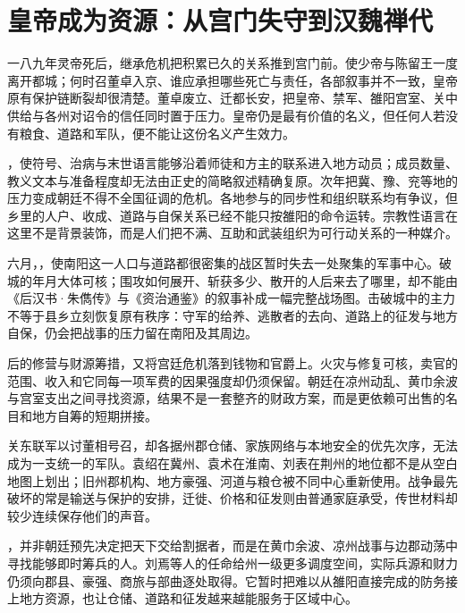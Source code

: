 \section{皇帝成为资源：从宫门失守到汉魏禅代}
\label{sec:eastern-han-breakdown}

一八九年灵帝死后，继承危机把积累已久的关系推到宫门前。使少帝与陈留王一度离开都城；何时召董卓入京、谁应承担哪些死亡与责任，各部叙事并不一致，皇帝原有保护链断裂却很清楚。董卓废立、迁都长安，把皇帝、禁军、雒阳宫室、关中供给与各州对诏令的信任同时置于压力。皇帝仍是最有价值的名义，但任何人若没有粮食、道路和军队，便不能让这份名义产生效力。

，使符号、治病与末世语言能够沿着师徒和方主的联系进入地方动员；成员数量、教义文本与准备程度却无法由正史的简略叙述精确复原。次年把冀、豫、兖等地的压力变成朝廷不得不全国征调的危机。各地参与的同步性和组织联系均有争议，但乡里的人户、收成、道路与自保关系已经不能只按雒阳的命令运转。宗教性语言在这里不是背景装饰，而是人们把不满、互助和武装组织为可行动关系的一种媒介。

六月，，使南阳这一人口与道路都很密集的战区暂时失去一处聚集的军事中心。破城的年月大体可核；围攻如何展开、斩获多少、散开的人后来去了哪里，却不能由《后汉书·朱儁传》与《资治通鉴》的叙事补成一幅完整战场图。击破城中的主力不等于县乡立刻恢复原有秩序：守军的给养、逃散者的去向、道路上的征发与地方自保，仍会把战事的压力留在南阳及其周边。

后的修营与财源筹措，又将宫廷危机落到钱物和官爵上。火灾与修复可核，卖官的范围、收入和它同每一项军费的因果强度却仍须保留。朝廷在凉州动乱、黄巾余波与宫室支出之间寻找资源，结果不是一套整齐的财政方案，而是更依赖可出售的名目和地方自筹的短期拼接。

关东联军以讨董相号召，却各据州郡仓储、家族网络与本地安全的优先次序，无法成为一支统一的军队。袁绍在冀州、袁术在淮南、刘表在荆州的地位都不是从空白地图上划出；旧州郡机构、地方豪强、河道与粮仓被不同中心重新使用。战争最先破坏的常是输送与保护的安排，迁徙、价格和征发则由普通家庭承受，传世材料却较少连续保存他们的声音。

，并非朝廷预先决定把天下交给割据者，而是在黄巾余波、凉州战事与边郡动荡中寻找能够即时筹兵的人。刘焉等人的任命给州一级更多调度空间，实际兵源和财力仍须向郡县、豪强、商旅与部曲逐处取得。它暂时把难以从雒阳直接完成的防务接上地方资源，也让仓储、道路和征发越来越能服务于区域中心。

